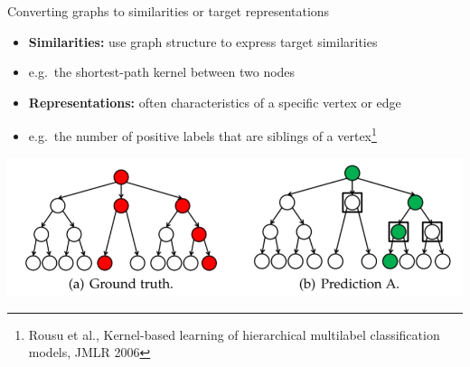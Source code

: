 \documentclass[]{beamer}
\begin{document}
\begin{frame}{Converting graphs to similarities or target representations}

\begin{itemize}
\item {\bf Similarities:} use graph structure to express target similarities
\item[] e.g.\ the shortest-path kernel between two nodes
\item {\bf Representations:}  often characteristics of a specific vertex or edge
\item[] e.g.\ the number of positive labels that are siblings of a vertex\footnote{Rousu et al., Kernel-based learning of hierarchical
multilabel classification models, JMLR 2006} 
\end{itemize}
\begin{center}
\includegraphics[scale=0.4,trim = 0 50 430 0,clip]{Figures/hloss}
\end{center}
\end{frame}
\end{document}

